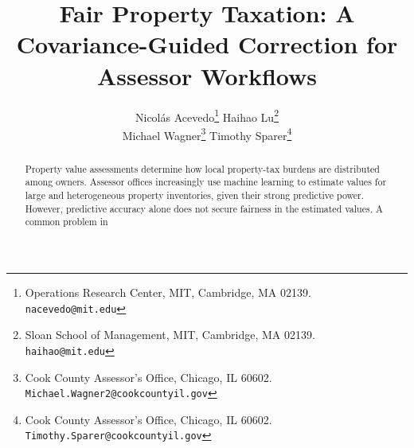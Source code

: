 \documentclass[10pt]{article}
\title{Fair Property Taxation:
A Covariance-Guided Correction for Assessor Workflows}
\author{
Nicol\'as Acevedo\thanks{Operations Research Center, MIT, Cambridge, MA 02139. \texttt{nacevedo@mit.edu}}
\qquad
Haihao Lu\thanks{Sloan School of Management, MIT, Cambridge, MA 02139. \texttt{haihao@mit.edu}}
\\[1ex]
Michael Wagner\thanks{Cook County Assessor's Office, Chicago, IL 60602. \texttt{Michael.Wagner2@cookcountyil.gov}}
\qquad
Timothy Sparer\thanks{Cook County Assessor's Office, Chicago, IL 60602. \texttt{Timothy.Sparer@cookcountyil.gov}}
}
\date{}
\theoremstyle{definition}
\newcommand{\1}{\mathbf{1}}
\newcommand{\oldtext}[1]{\textcolor{blue}{\sout{#1}}}
\newcommand{\newtext}[1]{\textcolor{impGreen}{#1}}
\begin{document}
\maketitle


\begin{abstract}

Property value assessments determine how local property-tax burdens are distributed among owners.
Assessor offices increasingly use machine learning to
estimate values for large and heterogeneous property inventories, given their strong predictive power. However, predictive accuracy alone does not secure fairness in the estimated values. A common problem in   



\end{abstract}
\end{document}
